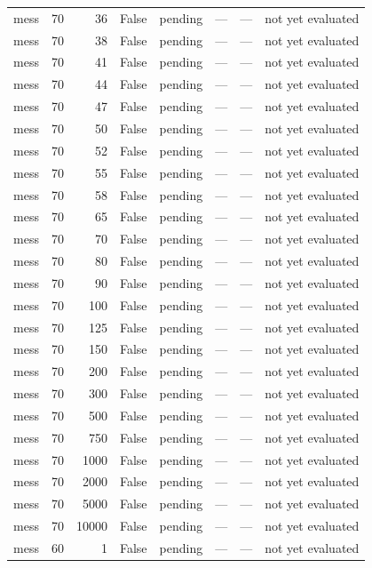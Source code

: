 \begin{tabular}{lrrrlrrl}
mess & 70 & 36 & False & pending & — & — & not yet evaluated \\
mess & 70 & 38 & False & pending & — & — & not yet evaluated \\
mess & 70 & 41 & False & pending & — & — & not yet evaluated \\
mess & 70 & 44 & False & pending & — & — & not yet evaluated \\
mess & 70 & 47 & False & pending & — & — & not yet evaluated \\
mess & 70 & 50 & False & pending & — & — & not yet evaluated \\
mess & 70 & 52 & False & pending & — & — & not yet evaluated \\
mess & 70 & 55 & False & pending & — & — & not yet evaluated \\
mess & 70 & 58 & False & pending & — & — & not yet evaluated \\
mess & 70 & 65 & False & pending & — & — & not yet evaluated \\
mess & 70 & 70 & False & pending & — & — & not yet evaluated \\
mess & 70 & 80 & False & pending & — & — & not yet evaluated \\
mess & 70 & 90 & False & pending & — & — & not yet evaluated \\
mess & 70 & 100 & False & pending & — & — & not yet evaluated \\
mess & 70 & 125 & False & pending & — & — & not yet evaluated \\
mess & 70 & 150 & False & pending & — & — & not yet evaluated \\
mess & 70 & 200 & False & pending & — & — & not yet evaluated \\
mess & 70 & 300 & False & pending & — & — & not yet evaluated \\
mess & 70 & 500 & False & pending & — & — & not yet evaluated \\
mess & 70 & 750 & False & pending & — & — & not yet evaluated \\
mess & 70 & 1000 & False & pending & — & — & not yet evaluated \\
mess & 70 & 2000 & False & pending & — & — & not yet evaluated \\
mess & 70 & 5000 & False & pending & — & — & not yet evaluated \\
mess & 70 & 10000 & False & pending & — & — & not yet evaluated \\
mess & 60 & 1 & False & pending & — & — & not yet evaluated \\

\end{tabular}
